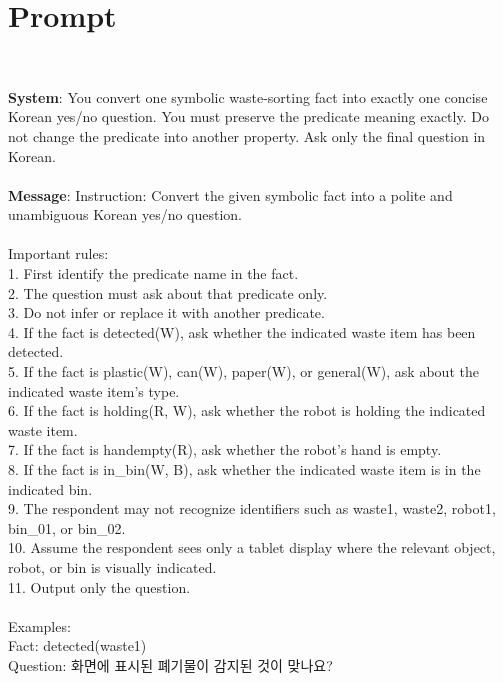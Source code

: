 \section{Prompt}~\label{appx:prompt}

\begin{tcolorbox}[breakable, title=Prompt for feedback manager (Waste Sorting), title filled=false, colback=black!5!white, colframe=black!75!black, left=2pt, right=2pt, top=2pt, bottom=2pt]
\textbf{System}: You convert one symbolic waste-sorting fact into exactly one concise Korean yes/no question. You must preserve the predicate meaning exactly. Do not change the predicate into another property. Ask only the final question in Korean.
\\
\\
\textbf{Message}: Instruction: Convert the given symbolic fact into a polite and unambiguous Korean yes/no question.\\
\\
Important rules:\\
1. First identify the predicate name in the fact.\\
2. The question must ask about that predicate only.\\
3. Do not infer or replace it with another predicate.\\
4. If the fact is detected(W), ask whether the indicated waste item has been detected.\\
5. If the fact is plastic(W), can(W), paper(W), or general(W), ask about the indicated waste item's type.\\
6. If the fact is holding(R, W), ask whether the robot is holding the indicated waste item.\\
7. If the fact is handempty(R), ask whether the robot's hand is empty.\\
8. If the fact is in\_bin(W, B), ask whether the indicated waste item is in the indicated bin.\\
9. The respondent may not recognize identifiers such as waste1, waste2, robot1, bin\_01, or bin\_02.\\
10. Assume the respondent sees only a tablet display where the relevant object, robot, or bin is visually indicated.\\
11. Output only the question.\\
\\
Examples:\\
Fact: detected(waste1)\\
Question: 화면에 표시된 폐기물이 감지된 것이 맞나요?\\

\end{tcolorbox}
